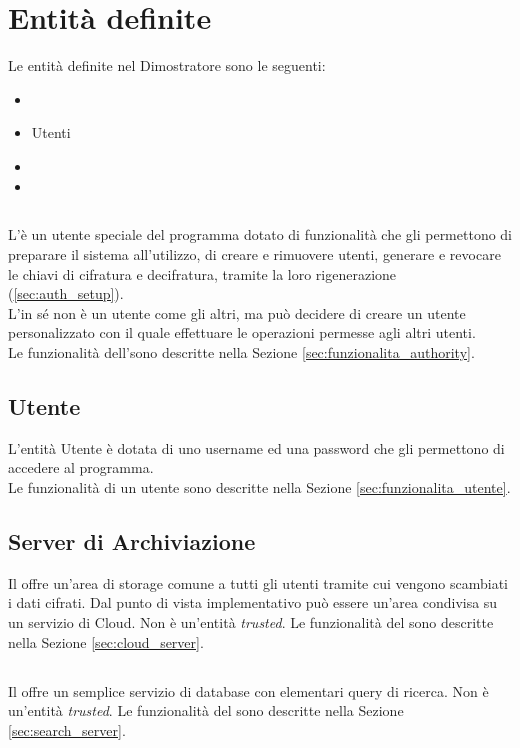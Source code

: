 \documentclass[a4paper,twoside,10pt,openany]{scrbook}
\begin{document}
\section{Entità definite}\label{sec:entita}
Le entità definite nel Dimostratore sono le seguenti:
\begin{itemize}
 \item \auth
 \item Utenti
 \item \sr
 \item \sa
\end{itemize}
\subsection{\auth}\label{sec:authority}
L'\auth è un utente speciale del programma dotato di funzionalità che gli permettono di preparare il sistema all'utilizzo, di creare e rimuovere utenti, generare e revocare le chiavi di cifratura e decifratura, tramite la loro rigenerazione (\ref{sec:auth_setup}).\\
L'\auth in sé non è un utente come gli altri, ma può decidere di creare un utente personalizzato con il quale effettuare le operazioni permesse agli altri utenti.\\
Le funzionalità dell'\auth sono descritte nella Sezione \ref{sec:funzionalita_authority}.
%
\subsection{Utente}\label{sec:users}
L'entità Utente è dotata di uno username ed una password che gli permettono di accedere al programma. \\
Le funzionalità di un utente sono descritte nella Sezione \ref{sec:funzionalita_utente}.
%
\subsection{Server di Archiviazione}\label{sec:serverarch}
Il \sa offre un'area di storage comune a tutti gli utenti tramite cui vengono scambiati i dati cifrati. Dal punto di vista implementativo può essere un'area condivisa su un servizio di Cloud. Non è un'entità \textit{trusted}.
Le funzionalità del \sa sono descritte nella Sezione \ref{sec:cloud_server}.
%
\subsection{\sr}\label{sec:serverric}
Il \sr offre un semplice servizio di database con elementari query di ricerca. Non è un'entità \textit{trusted}. 
Le funzionalità del \sr sono descritte nella Sezione \ref{sec:search_server}.
\end{document}
